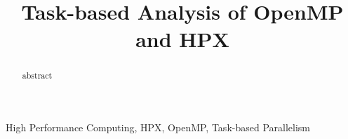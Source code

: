\documentclass[conference]{IEEEtran}
\begin{document}
\title{Task-based Analysis of OpenMP and HPX}

\author{
}

\maketitle

\begin{abstract}
abstract
\end{abstract}

\begin{IEEEkeywords}
High Performance Computing, HPX, OpenMP, Task-based Parallelism
\end{IEEEkeywords}
















{}
\end{document}
